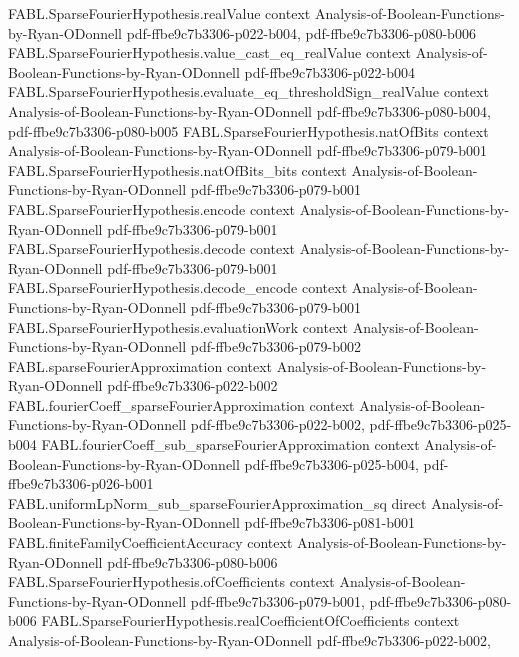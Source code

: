 \begin{theorem}
  {FABL.SparseFourierHypothesis.realValue}
  {context}
  {Analysis-of-Boolean-Functions-by-Ryan-ODonnell}
  {pdf-ffbe9c7b3306-p022-b004,
    pdf-ffbe9c7b3306-p080-b006}
\proofstep
  {FABL.SparseFourierHypothesis.value_cast_eq_realValue}
  {context}
  {Analysis-of-Boolean-Functions-by-Ryan-ODonnell}
  {pdf-ffbe9c7b3306-p022-b004}
\proofstep
  {FABL.SparseFourierHypothesis.evaluate_eq_thresholdSign_realValue}
  {context}
  {Analysis-of-Boolean-Functions-by-Ryan-ODonnell}
  {pdf-ffbe9c7b3306-p080-b004,
    pdf-ffbe9c7b3306-p080-b005}
\proofstep
  {FABL.SparseFourierHypothesis.natOfBits}
  {context}
  {Analysis-of-Boolean-Functions-by-Ryan-ODonnell}
  {pdf-ffbe9c7b3306-p079-b001}
\proofstep
  {FABL.SparseFourierHypothesis.natOfBits_bits}
  {context}
  {Analysis-of-Boolean-Functions-by-Ryan-ODonnell}
  {pdf-ffbe9c7b3306-p079-b001}
\proofstep
  {FABL.SparseFourierHypothesis.encode}
  {context}
  {Analysis-of-Boolean-Functions-by-Ryan-ODonnell}
  {pdf-ffbe9c7b3306-p079-b001}
\proofstep
  {FABL.SparseFourierHypothesis.decode}
  {context}
  {Analysis-of-Boolean-Functions-by-Ryan-ODonnell}
  {pdf-ffbe9c7b3306-p079-b001}
\proofstep
  {FABL.SparseFourierHypothesis.decode_encode}
  {context}
  {Analysis-of-Boolean-Functions-by-Ryan-ODonnell}
  {pdf-ffbe9c7b3306-p079-b001}
\proofstep
  {FABL.SparseFourierHypothesis.evaluationWork}
  {context}
  {Analysis-of-Boolean-Functions-by-Ryan-ODonnell}
  {pdf-ffbe9c7b3306-p079-b002}
\proofstep
  {FABL.sparseFourierApproximation}
  {context}
  {Analysis-of-Boolean-Functions-by-Ryan-ODonnell}
  {pdf-ffbe9c7b3306-p022-b002}
\proofstep
  {FABL.fourierCoeff_sparseFourierApproximation}
  {context}
  {Analysis-of-Boolean-Functions-by-Ryan-ODonnell}
  {pdf-ffbe9c7b3306-p022-b002,
    pdf-ffbe9c7b3306-p025-b004}
\proofstep
  {FABL.fourierCoeff_sub_sparseFourierApproximation}
  {context}
  {Analysis-of-Boolean-Functions-by-Ryan-ODonnell}
  {pdf-ffbe9c7b3306-p025-b004,
    pdf-ffbe9c7b3306-p026-b001}
\proofstep
  {FABL.uniformLpNorm_sub_sparseFourierApproximation_sq}
  {direct}
  {Analysis-of-Boolean-Functions-by-Ryan-ODonnell}
  {pdf-ffbe9c7b3306-p081-b001}
\proofstep
  {FABL.finiteFamilyCoefficientAccuracy}
  {context}
  {Analysis-of-Boolean-Functions-by-Ryan-ODonnell}
  {pdf-ffbe9c7b3306-p080-b006}
\proofstep
  {FABL.SparseFourierHypothesis.ofCoefficients}
  {context}
  {Analysis-of-Boolean-Functions-by-Ryan-ODonnell}
  {pdf-ffbe9c7b3306-p079-b001,
    pdf-ffbe9c7b3306-p080-b006}
\proofstep
  {FABL.SparseFourierHypothesis.realCoefficientOfCoefficients}
  {context}
  {Analysis-of-Boolean-Functions-by-Ryan-ODonnell}
  {pdf-ffbe9c7b3306-p022-b002,
}
\end{theorem}
